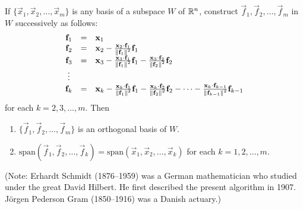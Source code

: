 \documentclass{ximera}
\begin{document}
%
\begin{theorem} \label{023713}
If $\{\vec{x}_{1}, \vec{x}_{2}, \dots , \vec{x}_{m}\}$ is any basis of a subspace $W$ of $\mathbb{R}^n$, construct $\vec{f}_{1}, \vec{f}_{2}, \dots , \vec{f}_{m}$ in $W$ successively as follows:
\begin{equation*}
\begin{array}{ccl}
\mathbf{f}_{1} &=& \mathbf{x}_{1} \\
\mathbf{f}_{2} &=& \mathbf{x}_{2} - \frac{\mathbf{x}_{2} \cdot \mathbf{f}_{1}}{\left\lVert\mathbf{f}_{1}\right\rVert^2}\mathbf{f}_{1} \\
\mathbf{f}_{3} &=& \mathbf{x}_{3} - \frac{\mathbf{x}_{3} \cdot \mathbf{f}_{1}}{\left\lVert\mathbf{f}_{1}\right\rVert^2}\mathbf{f}_{1} - \frac{\mathbf{x}_{3} \cdot \mathbf{f}_{2}}{\left\lVert\mathbf{f}_{2}\right\rVert^2}\mathbf{f}_{2} \\
\vdots &&\\
\mathbf{f}_{k} &=& \mathbf{x}_{k} - \frac{\mathbf{x}_{k} \cdot \mathbf{f}_{1}}{\left\lVert\mathbf{f}_{1}\right\rVert^2}\mathbf{f}_{1} - \frac{\mathbf{x}_{k} \cdot \mathbf{f}_{2}}{\left\lVert\mathbf{f}_{2}\right\rVert^2}\mathbf{f}_{2} - \dots -\frac{\mathbf{x}_{k} \cdot \mathbf{f}_{k-1}}{\left\lVert\mathbf{f}_{k-1}\right\rVert^2}\mathbf{f}_{k-1}
\end{array}
\end{equation*}
for each $k = 2, 3, \dots , m$. Then
\begin{enumerate}
\item $\{\vec{f}_{1}, \vec{f}_{2}, \dots , \vec{f}_{m}\}$ is an orthogonal basis of $W$.

\item $\mbox{span}\left(\vec{f}_{1}, \vec{f}_{2}, \dots , \vec{f}_{k}\right) = \mbox{span}\left(\vec{x}_{1}, \vec{x}_{2}, \dots , \vec{x}_{k}\right)$ for each $k = 1, 2, \dots , m$.

\end{enumerate}
\end{theorem}

(Note: Erhardt
 Schmidt (1876--1959) was a German mathematician who studied under the
great David Hilbert. He
 first described the present algorithm in 1907. J\"{o}rgen Pederson Gram
(1850--1916)  was a Danish actuary.)
\end{document}
